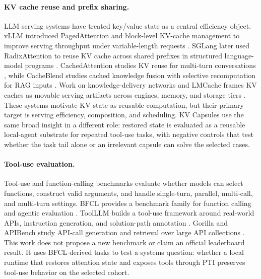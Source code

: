 \documentclass[11pt]{article}
\begin{document}
\paragraph{KV cache reuse and prefix sharing.}
LLM serving systems have treated key/value state as a central efficiency object. vLLM introduced PagedAttention and block-level KV-cache management to improve serving throughput under variable-length requests \cite{kwon2023pagedattention}. SGLang later used RadixAttention to reuse KV cache across shared prefixes in structured language-model programs \cite{zheng2023sglang}. CachedAttention studies KV reuse for multi-turn conversations \cite{gao2024cachedattention}, while CacheBlend studies cached knowledge fusion with selective recomputation for RAG inputs \cite{yao2024cacheblend}. Work on knowledge-delivery networks and LMCache frames KV caches as movable serving artifacts across engines, memory, and storage tiers \cite{cheng2024kdn}. These systems motivate KV state as reusable computation, but their primary target is serving efficiency, composition, and scheduling. KV Capsules use the same broad insight in a different role: restored state is evaluated as a reusable local-agent substrate for repeated tool-use tasks, with negative controls that test whether the task tail alone or an irrelevant capsule can solve the selected cases.

\paragraph{Tool-use evaluation.}
Tool-use and function-calling benchmarks evaluate whether models can select functions, construct valid arguments, and handle single-turn, parallel, multi-call, and multi-turn settings. BFCL provides a benchmark family for function calling and agentic evaluation \cite{bfcl2025}. ToolLLM builds a tool-use framework around real-world APIs, instruction generation, and solution-path annotation \cite{qin2023toollm}. Gorilla and APIBench study API-call generation and retrieval over large API collections \cite{patil2023gorilla}. This work does not propose a new benchmark or claim an official leaderboard result. It uses BFCL-derived tasks to test a systems question: whether a local runtime that restores attention state and exposes tools through PTI preserves tool-use behavior on the selected cohort.
\end{document}
